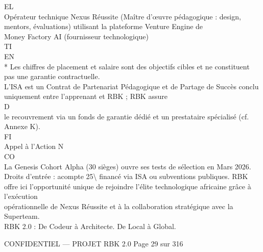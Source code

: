 EL\\
Opérateur technique          Nexus Réussite (Maître d’œuvre pédagogique : design, mentors, évaluations) utilisant la plateforme Venture Engine de\\
Money Factory AI (fournisseur technologique)\\
\vspace{0.5em}
\vspace{0.5em}
\vspace{0.5em}
\vspace{0.5em}
TI\\
EN\\
* Les chiffres de placement et salaire sont des objectifs cibles et ne constituent pas une garantie contractuelle.\\
\vspace{0.5em}
L’ISA est un Contrat de Partenariat Pédagogique et de Partage de Succès conclu uniquement entre l’apprenant et RBK ; RBK assure\\
\vspace{0.5em}
\vspace{0.5em}
\vspace{0.5em}
\vspace{0.5em}
D\\
le recouvrement via un fonds de garantie dédié et un prestataire spécialisé (cf. Annexe K).\\
\vspace{0.5em}
\vspace{0.5em}
\vspace{0.5em}
\vspace{0.5em}
FI\\
Appel à l’Action                                                N\\
CO\\
La Genesis Cohort Alpha (30 sièges) ouvre ses tests de sélection en Mars 2026. Droits d’entrée : acompte 25\textbackslash{}%
financé via ISA ou subventions publiques. RBK offre ici l’opportunité unique de rejoindre l’élite technologique africaine grâce à l’exécution\\
opérationnelle de Nexus Réussite et à la collaboration stratégique avec la Superteam.\\
\vspace{0.5em}
\vspace{0.5em}
\vspace{0.5em}
\vspace{0.5em}
RBK 2.0 : De Codeur à Architecte. De Local à Global.\\
\vspace{0.5em}
\vspace{0.5em}
\vspace{0.5em}
\vspace{0.5em}
\begin{confidential}CONFIDENTIEL — PROJET RBK 2.0                                                   Page 29 sur 316\end{confidential}
